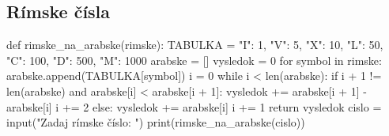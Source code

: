 \subsection{Rímske čísla}
\begin{solution}
def rimske_na_arabske(rimske):
    TABULKA = {"I": 1, "V": 5, "X": 10, "L": 50, "C": 100, "D": 500, "M": 1000}
    arabske = []
    vysledok = 0
    for symbol in rimske:
        arabske.append(TABULKA[symbol])
    i = 0
    while i < len(arabske):
        if i + 1 != len(arabske) and arabske[i] < arabske[i + 1]:
            vysledok += arabske[i + 1] - arabske[i]
            i += 2
        else:
            vysledok += arabske[i]
            i += 1
    return vysledok
cislo = input("Zadaj rímske číslo: ")
print(rimske_na_arabske(cislo))
\end{solution}

